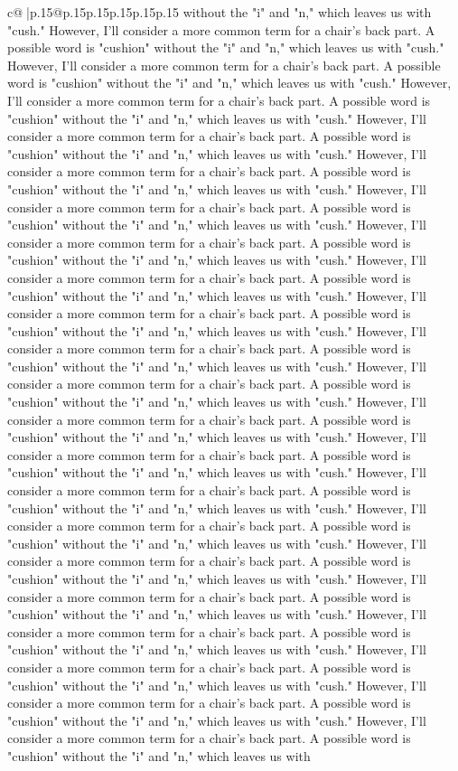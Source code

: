 \documentclass{article}
\begin{document}
{\begin{supertabular}{c@{$\;$}|p{.15\linewidth}@{}p{.15\linewidth}p{.15\linewidth}p{.15\linewidth}p{.15\linewidth}p{.15\linewidth}}
{{{without the "i" and "n," which leaves us with "cush." However, I'll consider a more common term for a chair's back part. A possible word is "cushion" without the "i" and "n," which leaves us with "cush." However, I'll consider a more common term for a chair's back part. A possible word is "cushion" without the "i" and "n," which leaves us with "cush." However, I'll consider a more common term for a chair's back part. A possible word is "cushion" without the "i" and "n," which leaves us with "cush." However, I'll consider a more common term for a chair's back part. A possible word is "cushion" without the "i" and "n," which leaves us with "cush." However, I'll consider a more common term for a chair's back part. A possible word is "cushion" without the "i" and "n," which leaves us with "cush." However, I'll consider a more common term for a chair's back part. A possible word is "cushion" without the "i" and "n," which leaves us with "cush." However, I'll consider a more common term for a chair's back part. A possible word is "cushion" without the "i" and "n," which leaves us with "cush." However, I'll consider a more common term for a chair's back part. A possible word is "cushion" without the "i" and "n," which leaves us with "cush." However, I'll consider a more common term for a chair's back part. A possible word is "cushion" without the "i" and "n," which leaves us with "cush." However, I'll consider a more common term for a chair's back part. A possible word is "cushion" without the "i" and "n," which leaves us with "cush." However, I'll consider a more common term for a chair's back part. A possible word is "cushion" without the "i" and "n," which leaves us with "cush." However, I'll consider a more common term for a chair's back part. A possible word is "cushion" without the "i" and "n," which leaves us with "cush." However, I'll consider a more common term for a chair's back part. A possible word is "cushion" without the "i" and "n," which leaves us with "cush." However, I'll consider a more common term for a chair's back part. A possible word is "cushion" without the "i" and "n," which leaves us with "cush." However, I'll consider a more common term for a chair's back part. A possible word is "cushion" without the "i" and "n," which leaves us with "cush." However, I'll consider a more common term for a chair's back part. A possible word is "cushion" without the "i" and "n," which leaves us with "cush." However, I'll consider a more common term for a chair's back part. A possible word is "cushion" without the "i" and "n," which leaves us with "cush." However, I'll consider a more common term for a chair's back part. A possible word is "cushion" without the "i" and "n," which leaves us with "cush." However, I'll consider a more common term for a chair's back part. A possible word is "cushion" without the "i" and "n," which leaves us with "cush." However, I'll consider a more common term for a chair's back part. A possible word is "cushion" without the "i" and "n," which leaves us with "cush." However, I'll consider a more common term for a chair's back part. A possible word is "cushion" without the "i" and "n," which leaves us with }}}
\end{supertabular}}
\end{document}
